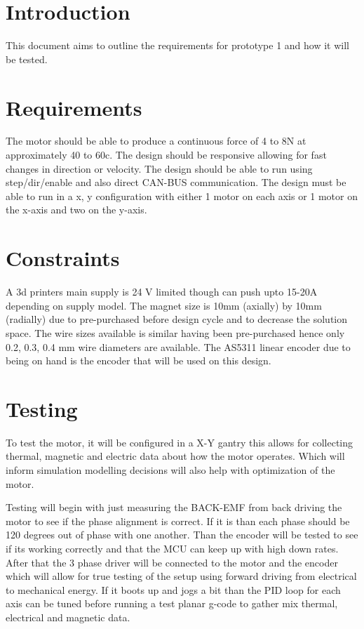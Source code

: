 \documentclass{article}
\begin{document}
\section{Introduction}
This document aims to outline the requirements for prototype 1 and how it will be
tested.

\section{Requirements}
The motor should be able to produce a continuous force of 4 to 8N at approximately 40 to 60c. The 
design should be responsive allowing for fast changes in direction or velocity. The design should
be able to run using step/dir/enable and also direct CAN-BUS communication. The design must be able
to run in a x, y configuration with either 1 motor on each axis or 1 motor on the x-axis and two on the y-axis.

\section{Constraints}
A 3d printers main supply is 24 V limited though can push upto 15-20A depending on supply model. The magnet size
is 10mm (axially) by 10mm (radially) due to pre-purchased before design cycle and to decrease the solution space.
The wire sizes available is similar having been pre-purchased hence only 0.2, 0.3, 0.4 mm wire diameters are available.
The AS5311 linear encoder due to being on hand is the encoder that will be used on this design.

\section{Testing}
To test the motor, it will be configured in a X-Y gantry this allows for collecting thermal, magnetic and electric data
about how the motor operates. Which will inform simulation modelling decisions will also help with optimization of the motor.

\vspace{0.5cm}
Testing will begin with just measuring the BACK-EMF from back driving the motor to see if the phase alignment is correct. If it is
than each phase should be 120 degrees out of phase with one another. Than the encoder will be tested to see if its working correctly
and that the MCU can keep up with high down rates. After that the 3 phase driver will be connected to the motor and the encoder which
will allow for true testing of the setup using forward driving from electrical to mechanical energy. If it boots up and jogs a bit than
the PID loop for each axis can be tuned before running a test planar g-code to gather mix thermal, electrical and magnetic data.
\end{document}

